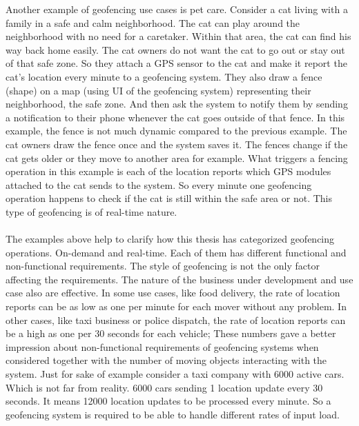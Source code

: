 \documentclass[a4]{report}
\begin{document}
    Another example of geofencing use cases is pet care\cite{pet-geofencing}.
    Consider a cat living with a family in a safe and calm neighborhood.
    The cat can play around the neighborhood with no need for a caretaker.
    Within that area, the cat can find his way back home easily.
    The cat owners do not want the cat to go out or stay out of that safe zone.
    So they attach a GPS sensor to the cat and make it report the cat's location every minute to a geofencing system.
    They also draw a fence (shape) on a map (using UI of the geofencing system) representing their neighborhood, the safe zone.
    And then ask the system to notify them by sending a notification to their phone whenever the cat goes outside
    of that fence.
    In this example, the fence is not much dynamic compared to the previous example.
    The cat owners draw the fence once and the system saves it.
    The fences change if the cat gets older or they move to another area for example.
    What triggers a fencing operation in this example is each of the location reports which GPS modules attached to the cat sends to the system.
    So every minute one geofencing operation happens to check if the cat is still within the safe area or
    not.
    This type of geofencing is of real-time nature.

    \paragraph{}
    The examples above help to clarify how this thesis has categorized geofencing operations.
    On-demand and real-time.
    Each of them has different functional and non-functional requirements.
    The style of geofencing is not the only factor affecting the requirements.
    The nature of the business under development and use case also are effective.
    In some use cases, like food delivery, the rate of location reports can be as low as one per minute for each mover without any problem.
    In other cases, like taxi business or police dispatch, the rate of location reports can be a high as one per 30
    seconds for each vehicle;
    These numbers gave a better impression about non-functional requirements of geofencing systems when considered
    together with the number of moving objects interacting with the system.
    Just for sake of example consider a taxi company with 6000 active cars.
    Which is not far from reality.
    6000 cars sending 1 location update every 30 seconds.
    It means 12000 location updates to be processed every minute.
    So a geofencing system is required to be able to handle different rates of input load.
\end{document}
